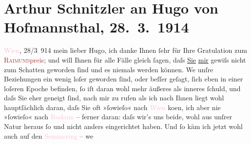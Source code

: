 

               \section[Arthur Schnitzler an Hugo von Hofmannsthal, 28. 3. 1914]{ Arthur Schnitzler an Hugo von Hofmannsthal, 28. 3. 1914}\nopagebreak{}\rehead{ }\normalsize\beginnumbering{} \toendnotes[C]{\smallbreak\pagebreak[2]} 
\toendnotes[C]{\smallbreak}\pstart
           \raggedleft{}{\pb}\textcolor{pink}{Wien}{}\ledrightnote{\textcolor{pink}{Wien}}, 28/3 914\pend
           \pstart
           mein lieber Hugo, ich danke Ihnen ſehr für Ihre Gratulation zum \textcolor{brown}{\textsc{Raimund}preis}{}\ledrightnote{\textcolor{brown}{Raimund-Preis}}; und will Ihnen für alle Fälle gleich
               ſagen, daſs \uline{Sie}{ }\uline{mir} gewiſs nicht zum Schatten geworden ſind und es
               niemals werden können. We{\geminationn} unſre Beziehungen ein wenig
               loſer geworden ſind, oder beſſer geſagt, ſich \introOben{}eben\introOben{} in einer
               loſeren Epoche befinden, ſo iſt daran wohl mehr äußeres als inneres ſchuld,  und
               daſs Sie eher geneigt ſind, nach mir zu rufen als ich nach Ihnen liegt wohl
               hauptſächlich daran, daſs Sie oft »ſowieſo« nach \textcolor{pink}{Wien}{}\ledrightnote{\textcolor{pink}{Wien}}
                  ko{\geminationm}en, ich aber nie »ſowieſo« nach \textcolor{pink}{Rodaun}{}\ledrightnote{\textcolor{pink}{Rodaun}} – ferner daran: daſs wir’s uns beide, wohl aus unſrer
               Natur heraus ſo und nicht anders eingerichtet haben. Und ſo käm ich jetzt wohl auch
               auf den \textcolor{pink}{Semmering}{}\ledrightnote{\textcolor{pink}{Semmering}} – we{\geminationn}
